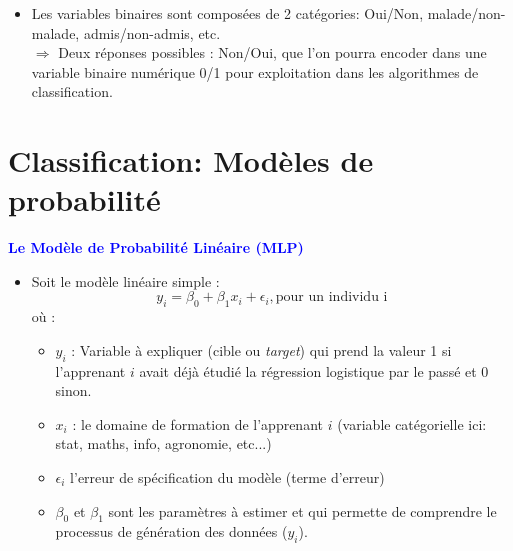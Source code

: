 \documentclass[12pt,aspectratio=1610]{beamer}
\begin{document}
\begin{frame}{}
	
	\begin{itemize}

		\item Les variables binaires sont composées de 2 catégories: Oui/Non, malade/non-malade, admis/non-admis, etc.
		\\
		$\Rightarrow$ Deux réponses possibles : Non/Oui, que l'on pourra encoder dans une variable binaire numérique  0/1 pour exploitation dans les algorithmes de classification.

	\end{itemize}
	
\end{frame}


	\section{Classification: Modèles de probabilité}
\begin{frame}
		\textcolor{blue}{\textbf{\large Le Modèle de Probabilité Linéaire (MLP) }}
		\begin{itemize}
			

		\item Soit le modèle linéaire simple  : 
	$$ y_i=\beta_0+\beta_1x_i+\epsilon_i, \text{pour un individu i} $$
	où : 
	
	\begin{itemize}
		\item $y_i$ :  Variable à expliquer (cible ou \textit{target}) qui prend la valeur 1 si l'apprenant  $i$ avait déjà étudié la régression logistique par le passé et 0 sinon.
		\item $x_i$ :  le domaine de formation de l'apprenant  $i$ (variable catégorielle ici: stat, maths, info, agronomie, etc...)
		\item $\epsilon_i$ l'erreur de spécification du modèle (terme d'erreur)
		\item $\beta_0$ et $\beta_1$ sont les paramètres à estimer et qui permette de comprendre le processus de génération des données ($y_i$).
	\end{itemize}
	
	\end{itemize}
	
\end{frame}
\end{document}
